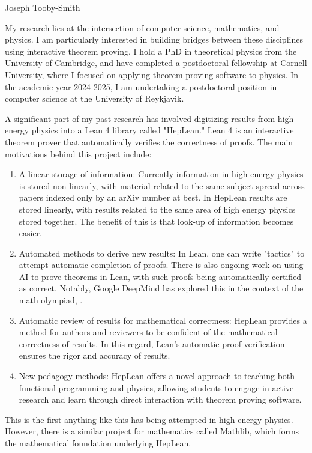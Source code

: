 \documentclass[12pt,letter]{article}
\newcounter{customtitle}
\begin{document}
\vspace{-1cm}
\begin{flushright}
{{\Large \color{white}Joseph Tooby-Smith }}
\end{flushright}
\vspace{0.4cm}

My research lies at the intersection of computer science, mathematics, and physics. I am particularly interested in building bridges between these disciplines using interactive theorem proving. I hold a PhD in theoretical physics from the University of Cambridge, and have completed a postdoctoral fellowship at Cornell University, where I focused on applying theorem proving software to physics. In the academic year 2024-2025, I am undertaking a postdoctoral position in computer science at the University of Reykjavik.

A significant part of my past research has involved digitizing results from high-energy physics into a Lean 4 library called "HepLean." Lean 4 is an interactive theorem prover that automatically verifies the correctness of proofs. The main motivations behind this project include:
\begin{enumerate}
\item A linear-storage of information: Currently information in high energy physics is stored non-linearly, with material related to the same subject spread across papers indexed only by an arXiv number at best. In HepLean results are stored linearly, with results related to the same area of high energy physics stored together. The benefit of this is that look-up of information becomes easier.
\item Automated methods to derive new results:  In Lean, one can write "tactics" to attempt automatic completion of proofs. There is also ongoing work on using AI to prove theorems in Lean, with such proofs being automatically certified as correct. Notably, Google DeepMind has explored this in the context of the math olympiad, .
\item Automatic review of results for mathematical correctness: HepLean provides a method for authors and reviewers to be confident of the mathematical correctness of results. In this regard, Lean's automatic proof verification ensures the rigor and accuracy of results.
\item New pedagogy methods:	 HepLean offers a novel approach to teaching both functional programming and physics, allowing students to engage in active research and learn through direct interaction with theorem proving software.
\end{enumerate}
 This is the first anything like this has being attempted
in high energy physics. However, there is a similar project for mathematics called Mathlib, which forms the mathematical foundation underlying HepLean.
\end{document}
